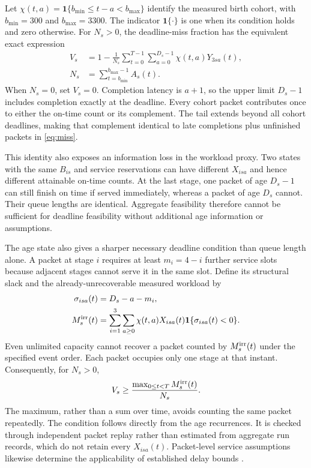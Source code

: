 \documentclass{IEEEoj}
\begin{document}
Let $\chi(t,a)=\mathbf1\{b_{\min}\le t-a<b_{\max}\}$ identify the measured
birth cohort, with $b_{\min}=300$ and $b_{\max}=3300$. The indicator
$\mathbf1\{\cdot\}$ is one when its condition holds and zero otherwise.
For $N_s>0$, the deadline-miss fraction has the equivalent exact expression
\begin{equation}
\begin{aligned}
 V_s&=1-\frac1{N_s}\sum_{t=0}^{T-1}\sum_{a=0}^{D_s-1}\chi(t,a)Y_{3sa}(t),\\
 N_s&=\sum_{t=b_{\min}}^{b_{\max}-1}A_s(t).
\end{aligned}
\label{eq:agemiss}
\end{equation}
When $N_s=0$, set $V_s=0$. Completion latency is $a+1$, so the upper limit
$D_s-1$ includes completion exactly at the deadline. Every cohort packet
contributes once to either the on-time count or its complement. The tail
extends beyond all cohort deadlines, making that complement identical to
late completions plus unfinished packets in \eqref{eq:miss}.

This identity also exposes an information loss in the workload proxy. Two
states with the same $B_{is}$ and service reservations can have different
$X_{isa}$ and hence different attainable on-time counts. At the last stage,
one packet of age $D_s-1$ can still finish on time if served immediately,
whereas a packet of age $D_s$ cannot. Their queue lengths are identical.
Aggregate feasibility therefore cannot be sufficient for deadline feasibility
without additional age information or assumptions.

The age state also gives a sharper necessary deadline condition than queue
length alone. A packet at stage $i$ requires at least $m_i=4-i$ further service
slots because adjacent stages cannot serve it in the same slot. Define its
structural slack and the already-unrecoverable measured workload by
\begin{align}
 \sigma_{isa}(t)&=D_s-a-m_i,\label{eq:structuralslack}\\
 M_s^{\rm irr}(t)&=\sum_{i=1}^{3}\sum_{a\ge0}\chi(t,a)X_{isa}(t)
            \mathbf1\{\sigma_{isa}(t)<0\}.\label{eq:hopeless}
\end{align}
Even unlimited capacity cannot recover a packet counted by $M_s^{\rm irr}(t)$ under
the specified event order. Each packet occupies only one stage at that instant.
Consequently, for $N_s>0$,
\begin{equation}
 V_s\ge\frac{\max_{0\le t<T}M_s^{\rm irr}(t)}{N_s}.
 \label{eq:slackbound}
\end{equation}
The maximum, rather than a sum over time, avoids counting the same packet
repeatedly. The condition follows directly from the age recurrences. It is checked through independent packet replay rather than estimated from aggregate run records, which do not retain every $X_{isa}(t)$. Packet-level service assumptions likewise determine the
applicability of established delay bounds \cite{packetbounds,iwrr}.
\end{document}
